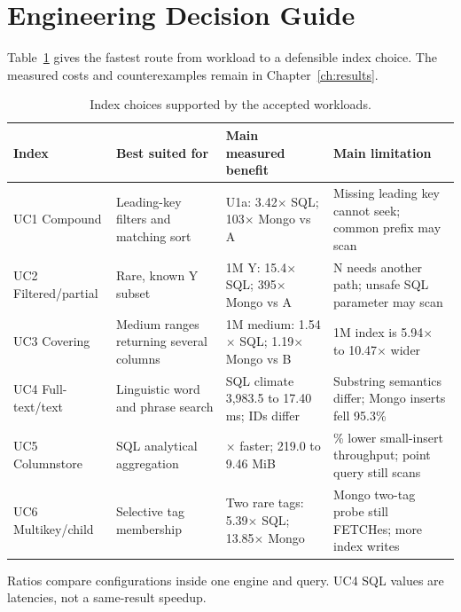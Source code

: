 \section{Engineering Decision Guide}
Table~\ref{tab:decision-guide} gives the fastest route from workload to a defensible index choice. The measured costs and counterexamples remain in Chapter~\ref{ch:results}.

\begin{table}[H]
\centering\small
\caption{Index choices supported by the accepted workloads.}
\label{tab:decision-guide}
\begin{tabularx}{\linewidth}{@{}l >{\raggedright\arraybackslash}X >{\raggedright\arraybackslash}X >{\raggedright\arraybackslash}X@{}}
\toprule
Index & Best suited for & Main measured benefit & Main limitation\\
\midrule
UC1 Compound & Leading-key filters and matching sort & U1a: 3.42$\times$ SQL; 103$\times$ Mongo vs A & Missing leading key cannot seek; common prefix may scan\\
UC2 Filtered/partial & Rare, known Y subset & 1M Y: 15.4$\times$ SQL; 395$\times$ Mongo vs A & N needs another path; unsafe SQL parameter may scan\\
UC3 Covering & Medium ranges returning several columns & 1M medium: 1.54$\times$ SQL; 1.19$\times$ Mongo vs B & 1M index is 5.94$\times$ to 10.47$\times$ wider\\
UC4 Full-text/text & Linguistic word and phrase search & SQL climate 3,983.5 to 17.40 ms; IDs differ & Substring semantics differ; Mongo inserts fell 95.3\%\\
UC5 Columnstore & SQL analytical aggregation & 2.90$\times$ faster; 219.0 to 9.46 MiB & 49.9\% lower small-insert throughput; point query still scans\\
UC6 Multikey/child & Selective tag membership & Two rare tags: 5.39$\times$ SQL; 13.85$\times$ Mongo & Mongo two-tag probe still FETCHes; more index writes\\
\bottomrule
\end{tabularx}
\par\smallskip\scriptsize\raggedright Ratios compare configurations inside one engine and query. UC4 SQL values are latencies, not a same-result speedup.\par
\end{table}

